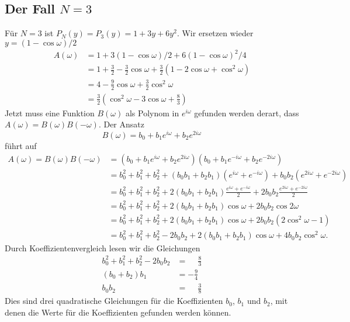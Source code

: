 \subsection{Der Fall $N=3$}
Für $N=3$ ist $P_N(y)=P_3(y)=1+3y+6y^2$.
Wir ersetzen wieder $y=(1-\cos\omega)/2$ 
\begin{align*}
A(\omega)
&=
1+3(1-\cos\omega)/2 + 6(1-\cos\omega)^2/4
\\
&=
1+\frac32-\frac32\cos\omega
+
\frac32(1-2\cos\omega+\cos^2\omega)
\\
&=
4
-
\frac92\cos\omega
+
\frac32\cos^2\omega
\\
&=
\frac32(\cos^2\omega -3\cos\omega + \frac{8}3)
\end{align*}
Jetzt muss eine Funktion $B(\omega)$ als Polynom in $e^{i\omega}$
gefunden werden derart, dass $A(\omega)=B(\omega)B(-\omega)$.
Der Ansatz
\[
B(\omega)
=
b_0 + b_1 e^{i\omega} + b_2 e^{2i\omega}
\]
führt auf
\begin{align*}
A(\omega)
=
B(\omega)B(-\omega)
&=
(b_0 + b_1 e^{i\omega} + b_2 e^{2i\omega})
(b_0 + b_1 e^{-i\omega} + b_2 e^{-2i\omega})
\\
&=
b_0^2 + b_1^2 + b_2^2
+
(b_0b_1 + b_2b_1)
(e^{i\omega}+e^{-i\omega})
+
b_0b_2
(e^{2i\omega}+e^{-2i\omega})
\\
&=
b_0^2 + b_1^2 + b_2^2
+
2(b_0b_1 + b_2b_1)
\frac{e^{i\omega}+e^{-i\omega}}2
+
2b_0b_2
\frac{e^{2i\omega}+e^{-2i\omega}}2
\\
&=
b_0^2 + b_1^2 + b_2^2
+
2(b_0b_1 + b_2b_1)
\cos\omega
+
2b_0b_2
\cos 2\omega
\\
&=
b_0^2 + b_1^2 + b_2^2
+
2(b_0b_1 + b_2b_1)
\cos\omega
+
2b_0b_2
(2\cos^2\omega-1)
\\
&=
b_0^2 + b_1^2 + b_2^2 -2b_0b_2
+
2(b_0b_1 + b_2b_1)
\cos\omega
+
4b_0b_2
\cos^2\omega.
\end{align*}
Durch Koeffizientenvergleich lesen wir die Gleichungen
\begin{align*}
b_0^2+b_1^2+b_2^2-2b_0b_2&=\phantom{-}\frac83
\\
(b_0+b_2)b_1 &= -\frac94
\\
b_0b_2
&=
\phantom{-}
\frac{3}{8}
\end{align*}
Dies sind drei quadratische Gleichungen für die Koeffizienten
$b_0$, $b_1$ und $b_2$, mit denen die Werte für die Koeffizienten
gefunden werden können.



